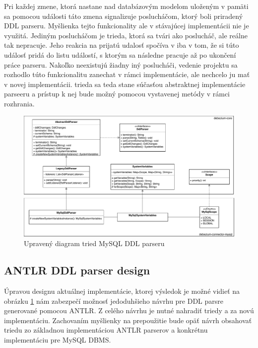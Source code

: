 Pri každej zmene, ktorá nastane nad databázovým modelom uloženým v pamäti sa pomocou události táto zmena signalizuje poslucháčom, ktorý boli priradený DDL parseru. Myšlienka tejto funkcionality ale v stávajúcej implementácii nie je využitá. Jediným poslucháčom je  trieda, ktorá sa tvári ako poslucháč, ale reálne tak nepracuje. Jeho reakcia na prijatú udalosť spočíva v iba v tom, že si túto událosť pridá do listu událostí, s ktorým sa následne pracuje až po ukončení práce parseru. Nakoľko neexistujú žiadny iný poslucháči, vedenie projektu sa rozhodlo túto funkcionalitu zanechat v rámci  implementácie, ale nechcelo ju mať v novej implementácii.  trieda sa teda stane súčasťou abstraktnej implementácie parseeru a prístup k nej bude možný pomocou vystavenej metódy v rámci  rozhrania.

\begin{figure}[H]
\begin{center}
\includegraphics[width=15cm]{figures/New_design.pdf}
\caption{Upravený diagram tried MySQL DDL parseru}
\label{fig:class_diagram_new}
\end{center}
\end{figure}

\subsection{ANTLR DDL parser design}
Úpravou designu aktuálnej implementácie, ktorej výsledok je možné vidieť na obrázku \ref{fig:class_diagram_new} nám zabezpečí možnosť jedoduhšieho návrhu pre DDL parsre generované pomocou \mbox{ANTLR}. Z celého návrhu je nutné nahradiť triedy  a  za novú implementáciu. Zachovaním myšlienky na prepoužitie bude opäť návrh obsahovať triedu zo základnou implementáciou ANTLR parserov a konkrétnu implementáciu pre MySQL DBMS.

